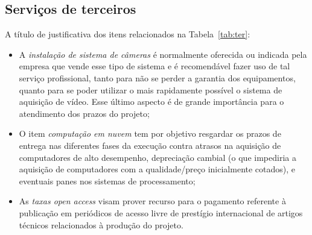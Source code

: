 \subsection{Serviços de terceiros}
A título de justificativa dos itens relacionados na Tabela~\ref{tab:ter}: 
\begin{itemize}
	\item A \emph{instalação de sistema de câmeras} é normalmente oferecida ou indicada pela empresa que vende esse tipo de sistema e é recomendável fazer uso de tal serviço profissional, tanto para não se perder a garantia dos equipamentos, quanto para se poder utilizar o mais rapidamente possível o sistema de aquisição de vídeo. Esse último aspecto é de grande importância para o atendimento dos prazos do projeto;
	\item O item \emph{computação em nuvem} tem por objetivo resgardar os prazos de entrega nas diferentes fases da execução contra atrasos na aquisição de computadores de alto desempenho, depreciação cambial (o que impediria a aquisição de computadores com a qualidade/preço inicialmente cotados), e eventuais panes nos sistemas de processamento;
	\item As \emph{taxas open access} visam prover recurso para o pagamento referente à publicação em periódicos de acesso livre de prestígio internacional de artigos técnicos relacionados à produção do projeto.
\end{itemize}
